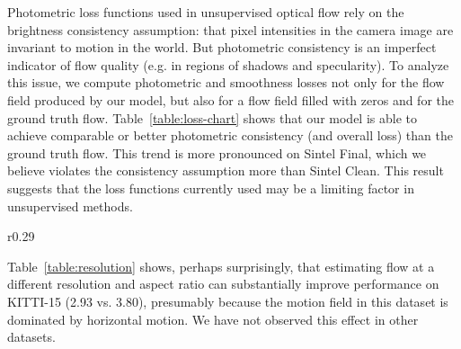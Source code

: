 \documentclass[runningheads]{llncs}
\begin{document}
 Photometric loss functions used in unsupervised optical flow rely on the brightness consistency assumption: that pixel intensities in the camera image are invariant to motion in the world. But photometric consistency is an imperfect indicator of flow quality (e.g. in regions of shadows and specularity). To analyze this issue, we compute photometric and smoothness losses not only for the flow field produced by our model, but also for a flow field filled with zeros and for the ground truth flow. Table~\ref{table:loss-chart} shows that our model is able to achieve comparable or better photometric consistency (and overall loss) than the ground truth flow. This trend is more pronounced on Sintel Final, which we believe violates the consistency assumption more than Sintel Clean. This result suggests that the loss functions currently used may be a limiting factor in unsupervised methods.

\begin{wraptable}{r}{0.29\columnwidth}
    \vspace{-10.5pt}
    \caption{Resolution}
    \label{table:resolution}
\end{wraptable}

 Table~\ref{table:resolution} shows, perhaps surprisingly, that estimating flow at a different resolution and aspect ratio can substantially improve performance on KITTI-15 (2.93 vs. 3.80), presumably because the motion field in this dataset is dominated by horizontal motion. We have not observed this effect in other datasets.
\end{document}

